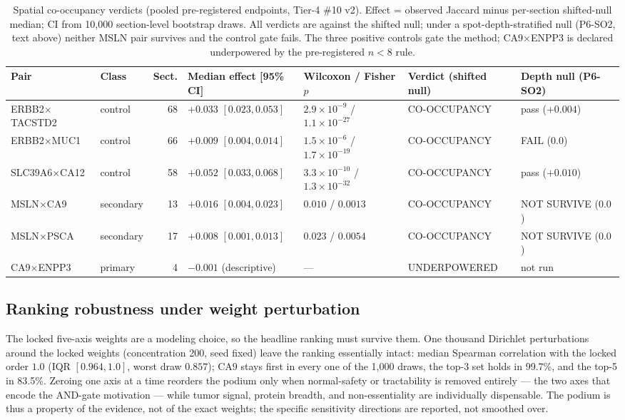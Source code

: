 \documentclass[11pt]{article}
\begin{document}
\begin{table}[t]\centering\footnotesize
\caption{Spatial co-occupancy verdicts (pooled pre-registered endpoints,
Tier-4 \#10 v2). Effect = observed Jaccard minus per-section shifted-null
median; CI from 10{,}000 section-level bootstrap draws. All verdicts are against the
shifted null; under a spot-depth-stratified null (P6-SO2, text above) neither MSLN pair
survives and the control gate fails. The three positive
controls gate the method; CA9$\times$ENPP3 is declared underpowered by the
pre-registered $n<8$ rule.}\label{tab:occupancy}
\begin{tabular}{llrlll@{\hspace{6pt}}l}
\toprule
Pair & Class & Sect. & Median effect [95\% CI] & Wilcoxon / Fisher $p$ & Verdict (shifted null) & Depth null (P6-SO2) \\
\midrule
ERBB2$\times$TACSTD2 & control & 68 & $+0.033$ $[0.023, 0.053]$ & $2.9{\times}10^{-9}$ / $1.1{\times}10^{-27}$ & CO-OCCUPANCY & pass ($+0.004$) \\
ERBB2$\times$MUC1 & control & 66 & $+0.009$ $[0.004, 0.014]$ & $1.5{\times}10^{-6}$ / $1.7{\times}10^{-19}$ & CO-OCCUPANCY & FAIL ($0.0$) \\
SLC39A6$\times$CA12 & control & 58 & $+0.052$ $[0.033, 0.068]$ & $3.3{\times}10^{-10}$ / $1.3{\times}10^{-32}$ & CO-OCCUPANCY & pass ($+0.010$) \\
MSLN$\times$CA9 & secondary & 13 & $+0.016$ $[0.004, 0.023]$ & $0.010$ / $0.0013$ & CO-OCCUPANCY & NOT SURVIVE ($0.0$) \\
MSLN$\times$PSCA & secondary & 17 & $+0.008$ $[0.001, 0.013]$ & $0.023$ / $0.0054$ & CO-OCCUPANCY & NOT SURVIVE ($0.0$) \\
CA9$\times$ENPP3 & primary & 4 & $-0.001$ (descriptive) & --- & UNDERPOWERED & not run \\
\bottomrule
\end{tabular}
\end{table}

\subsection{Ranking robustness under weight perturbation}
The locked five-axis weights are a modeling choice, so the headline ranking
must survive them. One thousand Dirichlet perturbations around the locked
weights (concentration 200, seed fixed) leave the ranking essentially intact:
median Spearman correlation with the locked order $1.0$ (IQR $[0.964, 1.0]$,
worst draw $0.857$); CA9 stays first in every one of the 1{,}000 draws, the
top-3 set holds in 99.7\%, and the top-5 in 83.5\%. Zeroing one axis at a
time reorders the podium only when normal-safety or tractability is removed
entirely --- the two axes that encode the AND-gate motivation --- while tumor
signal, protein breadth, and non-essentiality are individually dispensable.
The podium is thus a property of the evidence, not of the exact weights; the
specific sensitivity directions are reported, not smoothed over.
\end{document}
